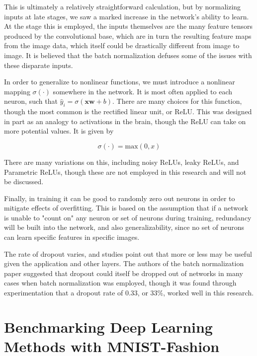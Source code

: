 This is ultimately a relatively straightforward calculation, but by normalizing inputs at late stages, we saw a marked increase in the network's ability to learn.
At the stage this is employed, the inputs themselves are the many feature tensors produced by the convolutional base, which are in turn the resulting feature maps from the image data, which itself could be drastically different from image to image.
It is believed that the batch normalization defuses some of the issues with these disparate inputs.

In order to generalize to nonlinear functions, we must introduce a nonlinear mapping $\sigma(\cdot)$ somewhere in the network.
It is most often applied to each neuron, such that $\hat{y}_i = \sigma\left(\textbf{x}\textbf{w} + b\right)$. 
There are many choices for this function, though the most common is the rectified linear unit, or ReLU.
This was designed in part as an analogy to activations in the brain, though the ReLU can take on more potential values.
It is given by

\begin{equation}
\sigma(\cdot) = \mathrm{max}(0,x)
\end{equation}

There are many variations on this, including noisy ReLUs, leaky ReLUs, and Parametric ReLUs, though these are not employed in this research and will not be discussed.

Finally, in training it can be good to randomly zero out neurons in order to mitigate effects of overfitting.
This is based on the assumption that if a network is unable to "count on" any neuron or set of neurons during training, redundancy will be built into the network, and also generalizability, since no set of neurons can learn specific features in specific images.

The rate of dropout varies, and studies point out that more or less may be useful given the application and other layers. 
The authors of the batch normalization paper suggested that dropout could itself be dropped out of networks in many cases when batch normalization was employed, though it was found through experimentation that a dropout rate of 0.33, or 33\%, worked well in this research.

\section{Benchmarking Deep Learning Methods with MNIST-Fashion}
\label{sec:classifying_benchmark}

